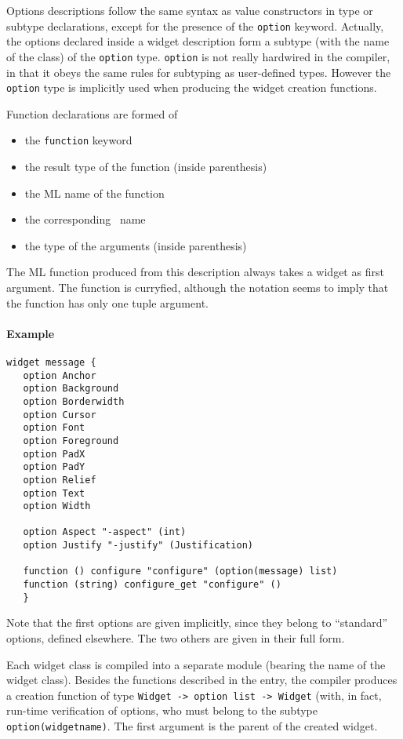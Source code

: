 Options descriptions follow the same syntax as value constructors in type or
subtype declarations, except for the presence of the \verb|option| keyword.
Actually, the options declared inside a widget description form a subtype
(with the name of the class) of the \verb|option| type. 
\verb|option| is not really hardwired in the compiler, in that it obeys the
same rules for subtyping as user-defined types. However the \verb|option|
type is implicitly used when producing the widget creation functions.

Function declarations are formed of
\begin{itemize}
\item the \verb|function| keyword
\item the result type of the function (inside parenthesis)
\item the ML name of the function
\item the corresponding \tk\ name
\item the type of the arguments (inside parenthesis)
\end{itemize} 

The ML function produced from this description always takes a widget as
first argument. The function is curryfied, although the notation seems to
imply that the function has only one tuple argument.


\paragraph{Example}
\begin{verbatim}
widget message {
   option Anchor
   option Background
   option Borderwidth
   option Cursor
   option Font
   option Foreground
   option PadX
   option PadY
   option Relief
   option Text
   option Width

   option Aspect "-aspect" (int)
   option Justify "-justify" (Justification)

   function () configure "configure" (option(message) list)
   function (string) configure_get "configure" ()
   }
\end{verbatim}
Note that the first options are given implicitly, since they belong to
``standard'' options, defined elsewhere. The two others are given in their
full form. 

Each widget class is compiled into a separate module (bearing the name of the
widget class). Besides the functions described in the entry, the compiler
produces a creation function of type \verb|Widget -> option list -> Widget|
(with, in fact, run-time verification of options, who must belong to the
subtype \verb|option(widgetname)|. The first argument is the parent of the
created widget.


